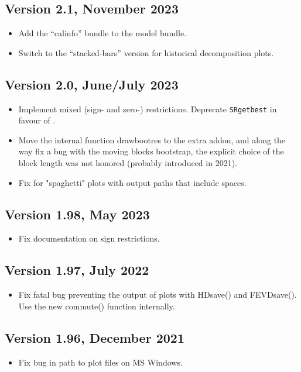\documentclass[a4paper,10pt]{article}
\newcommand{\cmd}[1]{\texttt{#1}}
\newcommand{\dtk}[1]{\texttt{\detokenize{#1}}}
\begin{document}
\subsection*{Version 2.1, November 2023}
\begin{itemize}
\item Add the ``calinfo'' bundle to the model bundle. 
\item Switch to the ``stacked-bars'' version for historical
  decomposition plots. 
\end{itemize}

\subsection*{Version 2.0, June/July 2023}
\begin{itemize}
\item Implement mixed (sign- and zero-) restrictions. Deprecate \cmd{SRgetbest}
 in favour of \dtk{SVAR_SRgetbest}. 
\item Move the internal function drawbootres to the extra addon, and along the
 way fix a bug with the moving blocks bootstrap, the explicit choice of the
 block length was not honored (probably introduced in 2021).  
\item Fix for "spaghetti" plots with output paths that include spaces.   
\end{itemize}

\subsection*{Version 1.98, May 2023}
\begin{itemize}
\item Fix documentation on sign restrictions.
\end{itemize}

\subsection*{Version 1.97, July 2022}
\begin{itemize}
\item Fix fatal bug preventing the output of plots with HDsave() and
  FEVDsave(). Use the new commute() function internally.
\end{itemize}

\subsection*{Version 1.96, December 2021}
\begin{itemize}
\item Fix bug in path to plot files on MS Windows.
\end{itemize}
\end{document}
